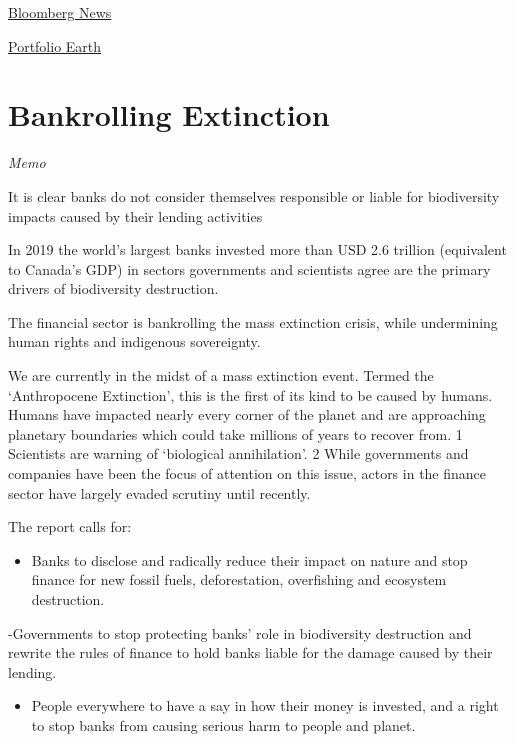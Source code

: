 \documentclass[
]{book}
\providecommand{\tightlist}{%
  \setlength{\itemsep}{0pt}\setlength{\parskip}{0pt}}
\begin{document}
\href{https://www.bloomberg.com/news/articles/2021-01-07/banks-directed-1-7-trillion-to-firms-causing-plastic-pollution}{Bloomberg News}

\href{https://portfolio.earth/}{Portfolio Earth}

\hypertarget{bankrolling-extinction}{%
\section{Bankrolling Extinction}\label{bankrolling-extinction}}

\emph{Memo}

It is clear banks
do not consider
themselves
responsible
or liable for
biodiversity
impacts caused
by their lending
activities

In 2019 the world's largest banks invested more than USD 2.6 trillion (equivalent to Canada's GDP) in sectors governments and scientists agree are the primary drivers of biodiversity destruction.

The financial sector is bankrolling the mass extinction crisis, while undermining human rights and indigenous sovereignty.

We are currently in the midst of a mass
extinction event. Termed the `Anthropocene
Extinction', this is the first of its kind to be
caused by humans. Humans have impacted
nearly every corner of the planet and are
approaching planetary boundaries which
could take millions of years to recover
from. 1 Scientists are warning of `biological
annihilation'. 2 While governments and
companies have been the focus of attention
on this issue, actors in the finance sector
have largely evaded scrutiny until recently.

The report calls for:

\begin{itemize}
\tightlist
\item
  Banks to disclose and radically reduce their
  impact on nature and stop finance for new
  fossil fuels, deforestation, overfishing and
  ecosystem destruction.
\end{itemize}

-Governments to stop protecting banks' role
in biodiversity destruction and rewrite the
rules of finance to hold banks liable for the
damage caused by their lending.

\begin{itemize}
\tightlist
\item
  People everywhere to have a say in how
  their money is invested, and a right to stop
  banks from causing serious harm to people
  and planet.
\end{itemize}
\end{document}
